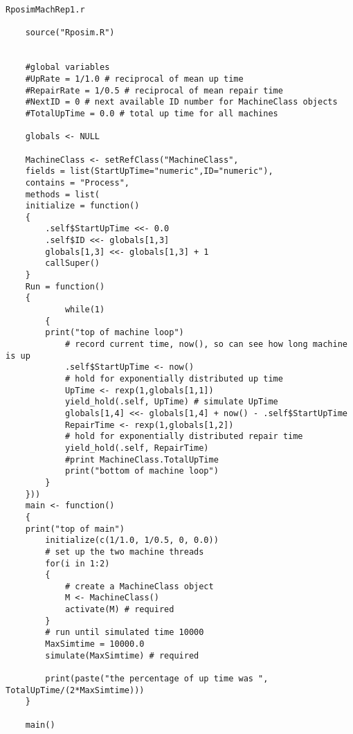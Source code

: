 \documentclass[titlepage]{article}
\begin{document}
\begin{verbatim}
RposimMachRep1.r

    source("Rposim.R")


    #global variables
    #UpRate = 1/1.0 # reciprocal of mean up time
    #RepairRate = 1/0.5 # reciprocal of mean repair time
    #NextID = 0 # next available ID number for MachineClass objects
    #TotalUpTime = 0.0 # total up time for all machines

    globals <- NULL

    MachineClass <- setRefClass("MachineClass",
    fields = list(StartUpTime="numeric",ID="numeric"),
    contains = "Process",
    methods = list(
    initialize = function()
    {
        .self$StartUpTime <<- 0.0
        .self$ID <<- globals[1,3]
        globals[1,3] <<- globals[1,3] + 1
        callSuper()
    }
    Run = function()
    {
            while(1)
        {
        print("top of machine loop")
            # record current time, now(), so can see how long machine is up
            .self$StartUpTime <- now()
            # hold for exponentially distributed up time
            UpTime <- rexp(1,globals[1,1])
            yield_hold(.self, UpTime) # simulate UpTime
            globals[1,4] <<- globals[1,4] + now() - .self$StartUpTime
            RepairTime <- rexp(1,globals[1,2])
            # hold for exponentially distributed repair time
            yield_hold(.self, RepairTime)
            #print MachineClass.TotalUpTime
            print("bottom of machine loop")
        }
    }))
    main <- function()
    {
    print("top of main")
        initialize(c(1/1.0, 1/0.5, 0, 0.0))
        # set up the two machine threads
        for(i in 1:2)
        {
            # create a MachineClass object
            M <- MachineClass()
            activate(M) # required
        }
        # run until simulated time 10000
        MaxSimtime = 10000.0
        simulate(MaxSimtime) # required

        print(paste("the percentage of up time was ", TotalUpTime/(2*MaxSimtime)))
    }

    main()

\end{verbatim}

\clearpage
\end{document}
